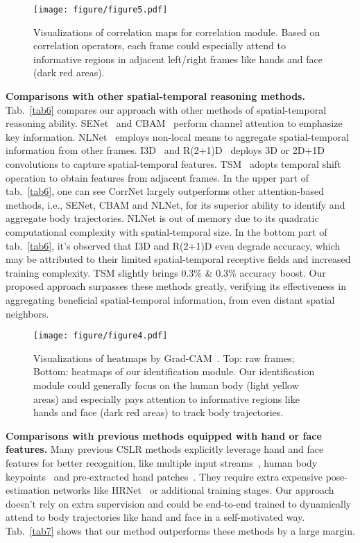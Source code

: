 \documentclass[10pt,twocolumn,letterpaper]{article}
\begin{document}
\begin{figure*}[t]
  \centering
  \texttt{[image: figure/figure5.pdf]}
  \caption{Visualizations of correlation maps for correlation module. Based on correlation operators, each frame could especially attend to informative regions in adjacent left/right frames like hands and face (dark red areas).}
  \label{fig4}
  \end{figure*}  

\textbf{Comparisons with other spatial-temporal reasoning methods.} 
Tab.~\ref{tab6} compares our approach with other methods of spatial-temporal reasoning ability. SENet~\cite{hu2018squeeze} and CBAM~\cite{woo2018cbam} perform channel attention to emphasize key information. NLNet~\cite{wang2018non} employs non-local means to aggregate spatial-temporal information from other frames. I3D~\cite{carreira2017quo} and R(2+1)D~\cite{tran2018closer} deploys 3D or 2D+1D convolutions to capture spatial-temporal features. TSM~\cite{lin2019tsm} adopts temporal shift operation to obtain features from adjacent frames. In the upper part of tab.~\ref{tab6}, one can see CorrNet largely outperforms other attention-based methods, i.e., SENet, CBAM and NLNet, for its superior ability to identify and aggregate body trajectories. NLNet is out of memory due to its quadratic computational complexity with spatial-temporal size. In the bottom part of tab.~\ref{tab6}, it's observed that I3D and R(2+1)D even degrade accuracy, which may be attributed to their limited spatial-temporal receptive fields and increased training complexity. TSM slightly brings 0.3\% \& 0.3\% accuracy boost. Our proposed approach surpasses these methods greatly, verifying its effectiveness in aggregating beneficial spatial-temporal information, from even distant spatial neighbors. 

\begin{figure}[t]
  \centering
  \texttt{[image: figure/figure4.pdf]}
  \caption{Visualizations of heatmaps by Grad-CAM~\cite{selvaraju2017grad}. Top: raw frames; Bottom: heatmaps of our identification module. Our identification module could generally focus on the human body (light yellow areas) and especially pays attention to informative regions like hands and face (dark red areas) to track body trajectories.}
  \label{fig5}
  \end{figure} 

\textbf{Comparisons with previous methods equipped with hand or face features.} Many previous CSLR methods explicitly leverage hand and face features for better recognition, like multiple input streams~\cite{koller2019weakly}, human body keypoints~\cite{zhou2020spatial,zuo2022c2slr} and pre-extracted hand patches~\cite{cui2019deep}. They require extra expensive pose-estimation networks like HRNet~\cite{wang2020deep} or additional training stages. Our approach doesn't rely on extra supervision and could be end-to-end trained to dynamically attend to body trajectories like hand and face in a self-motivated way. Tab.~\ref{tab7} shows that our method outperforms these methods by a large margin.
\end{document}
